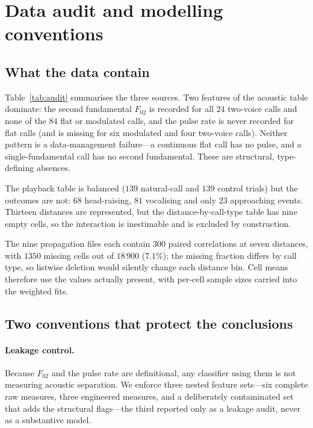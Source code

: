 \documentclass{apmcmthesis}
\begin{document}
\section{Data audit and modelling conventions}\label{sec:data}

\subsection{What the data contain}

Table~\ref{tab:audit} summarises the three sources. Two features of the acoustic table
dominate: the second fundamental $F_{02}$ is recorded for all $24$ two-voice calls and none
of the $84$ flat or modulated calls, and the pulse rate is never recorded for flat calls
(and is missing for six modulated and four two-voice calls). Neither pattern is a
data-management failure---a continuous flat call has no pulse, and a single-fundamental
call has no second fundamental. These are structural, type-defining absences.

The playback table is balanced ($139$ natural-call and $139$ control trials) but the
outcomes are not: $68$ head-raising, $81$ vocalising and only $23$ approaching events.
Thirteen distances are represented, but the distance-by-call-type table has nine empty
cells, so the interaction is inestimable and is excluded by construction.

The nine propagation files each contain $300$ paired correlations at seven distances, with
$1350$ missing cells out of $18\,900$ ($7.1\%$); the missing fraction differs by call type,
so listwise deletion would silently change each distance bin. Cell means therefore use the
values actually present, with per-cell sample sizes carried into the weighted fits.

\subsection{Two conventions that protect the conclusions}

\paragraph{Leakage control.} Because $F_{02}$ and the pulse rate are definitional, any
classifier using them is not measuring acoustic separation. We enforce three nested
feature sets---six complete raw measures, three engineered measures, and a deliberately
contaminated set that adds the structural flags---the third reported only as a leakage
audit, never as a substantive model.
\end{document}

